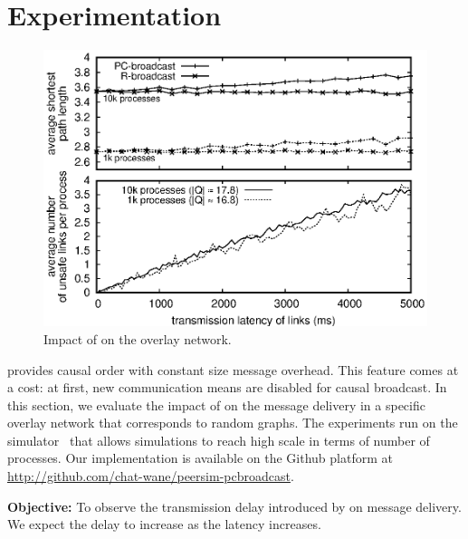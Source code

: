 
\section{Experimentation}
\label{sec:experimentation}

\begin{figure}
  \begin{center}
    \includegraphics[width=0.99\columnwidth]{./img/delay.eps}
    \caption{\label{fig:delay}Impact of \CBROADCAST on the overlay network.}
  \end{center}
\end{figure}

\CBROADCAST provides causal order with constant size message
overhead. This feature comes at a cost: at first, new communication
means are disabled for causal broadcast. In this section, we evaluate
the impact of \CBROADCAST on the message delivery in a specific
overlay network that corresponds to random graphs. The experiments run
on the \PEERSIM simulator~\cite{montresor2009peersim} that allows
simulations to reach high scale in terms of number of processes. Our
implementation is available on the Github platform at
\url{http://github.com/chat-wane/peersim-pcbroadcast}.


\noindent \textbf{Objective:} To observe the transmission delay introduced by
\CBROADCAST on message delivery. We expect the delay to increase as the latency
increases.

